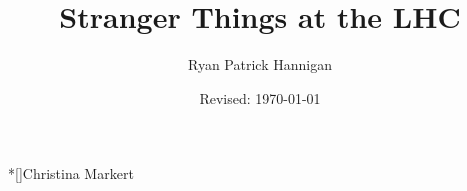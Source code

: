 \documentclass{utthesis}
\begin{document}
\author{Ryan Patrick Hannigan} 
\title{Stranger Things at the LHC}
\date{Revised: \today}

\frontmatter

\UTcopyrightlegend %

\begin{UTcommittee}
\end{UTcommittee}


\setcounter{page}{4}



% 
%

\begin{UTabstract}*[]{Christina Markert}
    
\end{UTabstract}






\mainmatter



% 
% 
% 
% 
% 

% 

% 

\backmatter

\printindex

\cleardoublepage
{}

\printbibliography
\end{document}
